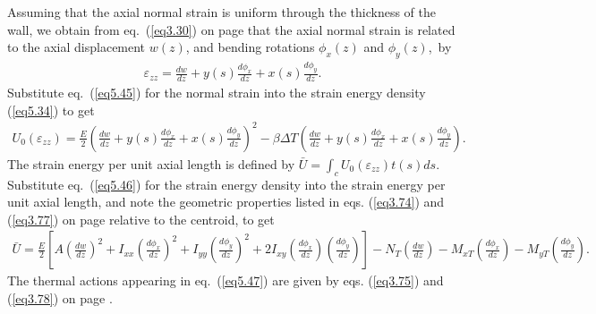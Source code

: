 \documentclass{AeroStructure-ERJohnson}
\begin{document}
Assuming that the axial normal strain is uniform through the thickness of the wall, we obtain from eq.~(\ref{eq3.30}) on page \pageref{eq3.30} that the axial normal strain is related to the axial displacement $w(z)$, and bending rotations $\phi_{x}(z)$ and $\phi_{y}(z)$,~by
\begin{align}\label{eq5.45}
\varepsilon_{z z}=\frac{d w}{d z}+y(s) \frac{d \phi_{x}}{d z}+x(s) \frac{d \phi_{y}}{d z}.
\end{align}
Substitute eq.~(\ref{eq5.45}) for the normal strain into the strain energy density (\ref{eq5.34}) to get
\begin{align}\label{eq5.46}
U_{0}\left(\varepsilon_{z z}\right)=\frac{E}{2}\left(\frac{d w}{d z}+y(s) \frac{d \phi_{x}}{d z}+x(s) \frac{d \phi_{y}}{d z}\right)^{2}-\beta \Delta T\left(\frac{d w}{d z}+y(s) \frac{d \phi_{x}}{d z}+x(s) \frac{d \phi_{y}}{d z}\right).
\end{align}
The strain energy per unit axial length is defined by $\bar{U}=\int_{c} U_{0}\left(\varepsilon_{z z}\right) t(s) d s$. Substitute eq.~(\ref{eq5.46}) for the strain energy density into the strain energy per unit axial length, and note the geometric properties listed in eqs. (\ref{eq3.74}) and (\ref{eq3.77}) on page \pageref{eq3.77} relative to the centroid, to get
\begin{align}\label{eq5.47}
\bar{U}=\frac{E}{2}\left[A\left(\frac{d w}{d z}\right)^{2}+I_{x x}\left(\frac{d \phi_{x}}{d z}\right)^{2}+I_{y y}\left(\frac{d \phi_{y}}{d z}\right)^{2}+2 I_{x y}\left(\frac{d \phi_{x}}{d z}\right)\left(\frac{d \phi_{y}}{d z}\right)\right]-N_{T}\left(\frac{d w}{d z}\right)-M_{xT}\left(\frac{d \phi_{x}}{d z}\right)-M_{y T}\left(\frac{d \phi_{y}}{d z}\right).
\end{align}
The thermal actions appearing in eq.~(\ref{eq5.47}) are given by eqs. (\ref{eq3.75}) and (\ref{eq3.78}) on page \pageref{eq3.78}.
\end{document}
